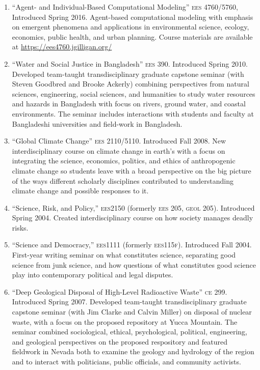 \begin{enumerate}
\item ``Agent- and Individual-Based Computational Modeling'' \textsc{ees 4760/5760}, Introduced Spring 2016. Agent-based computational modeling with emphasis on emergent phenomena and applications in environmental science, ecology, economics, public health, and urban planning. Course materials are available at \url{https://ees4760.jgilligan.org/}
\item ``Water and Social Justice in Bangladesh'' \textsc{ees 390}. Introduced Spring 2010. Developed team-taught transdisciplinary graduate capstone seminar (with Steven Goodbred and Brooke Ackerly) combining perspectives from natural sciences, engineering, social sciences, and humanities to study water resources and hazards in Bangladesh with focus on rivers, ground water, and coastal environments. The seminar includes interactions with students and faculty at Bangladeshi universities and field-work in Bangladesh.
\item ``Global Climate Change'' \textsc{ees 2110/5110}. Introduced Fall 2008. New interdisciplinary course on climate change in earth's with a focus on integrating the science, economics, politics, and ethics of anthropogenic climate change so students leave with a broad perspective on the big picture of the ways different scholarly disciplines contributed to understanding climate change and possible responses to it.
\item ``Science, Risk, and Policy,'' \textsc{ees2150} (formerly \textsc{ees 205}, \textsc{geol 205}). Introduced Spring 2004. Created interdisciplinary course on how society manages deadly risks.
\item ``Science and Democracy,'' \textsc{ees1111} (formerly \textsc{ees115f}). Introduced Fall 2004.  First-year writing seminar on what constitutes science, separating good science from junk science, and how questions of what constitutes good science play into contemporary political and legal disputes.
\item ``Deep Geological Disposal of High-Level Radioactive Waste'' \textsc{ce 299}. Introduced Spring 2007. Developed team-taught transdisciplinary graduate capstone seminar (with Jim Clarke and Calvin Miller) on disposal of nuclear waste, with a focus on the proposed repository at Yucca Mountain. The seminar combined sociological, ethical, psychological, political, engineering, and geological perspectives on the proposed respository and featured fieldwork in Nevada both to examine the geology and hydrology of the region and to interact with politicians, public officials, and community activists.

\end{enumerate}
